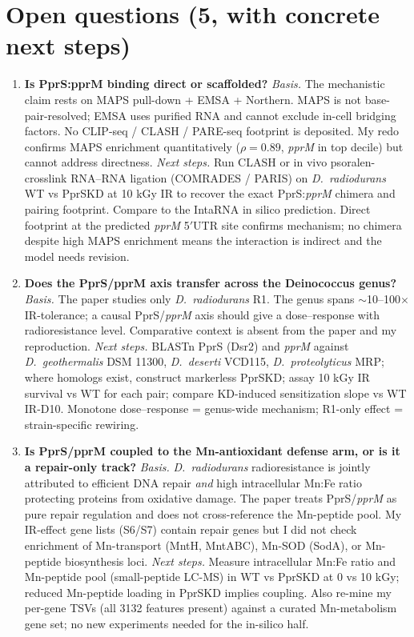 \section*{Open questions (5, with concrete next steps)}

\begin{enumerate}

\item \textbf{Is PprS:pprM binding direct or scaffolded?}
\emph{Basis.} The mechanistic claim rests on MAPS pull-down + EMSA + Northern. MAPS is not base-pair-resolved; EMSA uses purified RNA and cannot exclude in-cell bridging factors. No CLIP-seq / CLASH / PARE-seq footprint is deposited. My redo confirms MAPS enrichment quantitatively ($\rho=0.89$, \emph{pprM} in top decile) but cannot address directness.
\emph{Next steps.} Run CLASH or in vivo psoralen-crosslink RNA--RNA ligation (COMRADES / PARIS) on \emph{D.\ radiodurans} WT vs PprSKD at 10 kGy IR to recover the exact PprS:\emph{pprM} chimera and pairing footprint. Compare to the IntaRNA in silico prediction. Direct footprint at the predicted \emph{pprM} 5$'$UTR site confirms mechanism; no chimera despite high MAPS enrichment means the interaction is indirect and the model needs revision.

\item \textbf{Does the PprS/pprM axis transfer across the Deinococcus genus?}
\emph{Basis.} The paper studies only \emph{D.\ radiodurans} R1. The genus spans $\sim$10--100$\times$ IR-tolerance; a causal PprS/\emph{pprM} axis should give a dose--response with radioresistance level. Comparative context is absent from the paper and my reproduction.
\emph{Next steps.} BLASTn PprS (Dsr2) and \emph{pprM} against \emph{D.\ geothermalis} DSM 11300, \emph{D.\ deserti} VCD115, \emph{D.\ proteolyticus} MRP; where homologs exist, construct markerless PprSKD; assay 10 kGy IR survival vs WT for each pair; compare KD-induced sensitization slope vs WT IR-D10. Monotone dose--response = genus-wide mechanism; R1-only effect = strain-specific rewiring.

\item \textbf{Is PprS/pprM coupled to the Mn-antioxidant defense arm, or is it a repair-only track?}
\emph{Basis.} \emph{D.\ radiodurans} radioresistance is jointly attributed to efficient DNA repair \emph{and} high intracellular Mn:Fe ratio protecting proteins from oxidative damage. The paper treats PprS/\emph{pprM} as pure repair regulation and does not cross-reference the Mn-peptide pool. My IR-effect gene lists (S6/S7) contain repair genes but I did not check enrichment of Mn-transport (MntH, MntABC), Mn-SOD (SodA), or Mn-peptide biosynthesis loci.
\emph{Next steps.} Measure intracellular Mn:Fe ratio and Mn-peptide pool (small-peptide LC-MS) in WT vs PprSKD at 0 vs 10 kGy; reduced Mn-peptide loading in PprSKD implies coupling. Also re-mine my per-gene TSVs (all 3132 features present) against a curated Mn-metabolism gene set; no new experiments needed for the in-silico half.


\end{enumerate}
